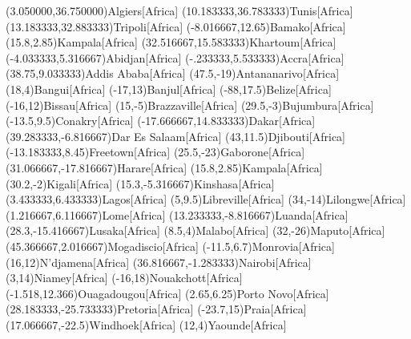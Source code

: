 \mapputIIID[90](3.050000,36.750000){Algiers}[Africa]
\mapputIIID[90](10.183333,36.783333){Tunis}[Africa]
\mapputIIID[90](13.183333,32.883333){Tripoli}[Africa]
\mapputIIID[90](-8.016667,12.65){Bamako}[Africa] %
\mapputIIID[90](15.8,2.85){Kampala}[Africa] %
\mapputIIID[90](32.516667,15.583333){Khartoum}[Africa] %
\mapputIIID[90](-4.033333,5.316667){Abidjan}[Africa] %
\mapputIIID[90](-.233333,5.533333){Accra}[Africa] %
\mapputIIID[90](38.75,9.033333){Addis Ababa}[Africa] %
\mapputIIID[90](47.5,-19){Antananarivo}[Africa] %
\mapputIIID[90](18,4){Bangui}[Africa] %
\mapputIIID[0](-17,13){Banjul}[Africa] %
\mapputIIID[90](-88,17.5){Belize}[Africa] %
\mapputIIID[180](-16,12){Bissau}[Africa] %
\mapputIIID[90](15,-5){Brazzaville}[Africa] %
\mapputIIID[90](29.5,-3){Bujumbura}[Africa] %
\mapputIIID[180](-13.5,9.5){Conakry}[Africa] %
\mapputIIID[90](-17.666667,14.833333){Dakar}[Africa] %
\mapputIIID[90](39.283333,-6.816667){Dar Es Salaam}[Africa] %
\mapputIIID[90](43,11.5){Djibouti}[Africa] %
\mapputIIID[180](-13.183333,8.45){Freetown}[Africa] %
\mapputIIID[90](25.5,-23){Gaborone}[Africa] %
\mapputIIID[90](31.066667,-17.816667){Harare}[Africa] %
\mapputIIID[90](15.8,2.85){Kampala}[Africa] %
\mapputIIID[90](30.2,-2){Kigali}[Africa] %
\mapputIIID[0](15.3,-5.316667){Kinshasa}[Africa] %
\mapputIIID[90](3.433333,6.433333){Lagos}[Africa] %
\mapputIIID[90](5,9.5){Libreville}[Africa] %
\mapputIIID[90](34,-14){Lilongwe}[Africa] %
\mapputIIID[90](1.216667,6.116667){Lome}[Africa] %
\mapputIIID[90](13.233333,-8.816667){Luanda}[Africa] %
\mapputIIID[90](28.3,-15.416667){Lusaka}[Africa] %
\mapputIIID[180](8.5,4){Malabo}[Africa] %
\mapputIIID[0](32,-26){Maputo}[Africa] %
\mapputIIID[90](45.366667,2.016667){Mogadiscio}[Africa] %
\mapputIIID[180](-11.5,6.7){Monrovia}[Africa] %
\mapputIIID[90](16,12){N'djamena}[Africa] %
\mapputIIID[90](36.816667,-1.283333){Nairobi}[Africa] %
\mapputIIID[90](3,14){Niamey}[Africa] %
\mapputIIID[90](-16,18){Nouakchott}[Africa] %
\mapputIIID[90](-1.518,12.366){Ouagadougou}[Africa] %
\mapputIIID[-90](2.65,6.25){Porto Novo}[Africa] %
\mapputIIID[90](28.183333,-25.733333){Pretoria}[Africa] %
\mapputIIID[180](-23.7,15){Praia}[Africa] %
\mapputIIID[90](17.066667,-22.5){Windhoek}[Africa] %
\mapputIIID[90](12,4){Yaounde}[Africa] %
